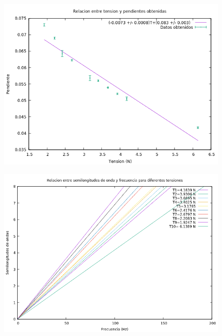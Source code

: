 \documentclass[10pt,a4paper]{article}
\begin{document}
\begin{figure}[H]
\includegraphics[scale=0.65]{t.png}
\centering
\end{figure}

\begin{figure}[H]
\includegraphics[scale=0.65]{total.png}
\centering
\end{figure}

\newpage
\end{document}
